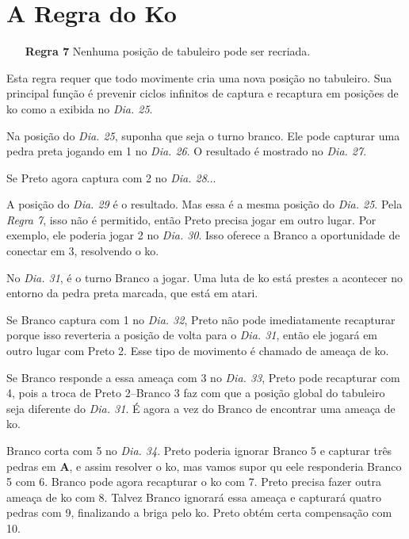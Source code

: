 \chapter{A Regra do Ko}

\begin{itemize}
  \item[\textbf{Regra 7}] Nenhuma posição de tabuleiro pode ser recriada.
\end{itemize}

Esta regra requer que todo movimente cria uma nova posição no tabuleiro. Sua principal função é prevenir ciclos infinitos de captura e recaptura em posições de ko como a exibida no \emph{Dia. 25}.


Na posição do \emph{Dia. 25}, suponha que seja o turno branco. Ele pode capturar uma pedra preta jogando em 1 no \emph{Dia. 26}. O resultado é mostrado no \emph{Dia. 27}.

Se Preto agora captura com 2 no \emph{Dia. 28}...

A posição do \emph{Dia. 29} é o resultado. Mas essa é a mesma posição do \emph{Dia. 25}. Pela \emph{Regra 7}, isso não é permitido, então Preto precisa jogar em outro lugar. Por exemplo, ele poderia jogar 2 no \emph{Dia. 30}. Isso oferece a Branco a oportunidade de conectar em 3, resolvendo o ko.

No \emph{Dia. 31}, é o turno Branco a jogar. Uma luta de ko está prestes a acontecer no entorno da pedra preta marcada, que está em atari.

Se Branco captura com 1 no \emph{Dia. 32}, Preto não pode imediatamente recapturar porque isso reverteria a posição de volta para o \emph{Dia. 31}, então ele jogará em outro lugar com Preto 2. Esse tipo de movimento é chamado de ameaça de ko.

Se Branco responde a essa ameaça com 3 no \emph{Dia. 33}, Preto pode recapturar com 4, pois a troca de Preto 2--Branco 3 faz com que a posição global do tabuleiro seja diferente do \emph{Dia. 31}. É agora a vez do Branco de encontrar uma ameaça de ko.

Branco corta com 5 no \emph{Dia. 34}. Preto poderia ignorar Branco 5 e capturar três pedras em \textbf{A}, e assim  resolver o ko, mas vamos supor qu eele responderia Branco 5 com 6. Branco pode agora recapturar o ko com 7. Preto precisa fazer outra ameaça de ko com 8. Talvez Branco ignorará essa ameaça e capturará quatro pedras com 9, finalizando a briga pelo ko. Preto obtém certa compensação com 10.